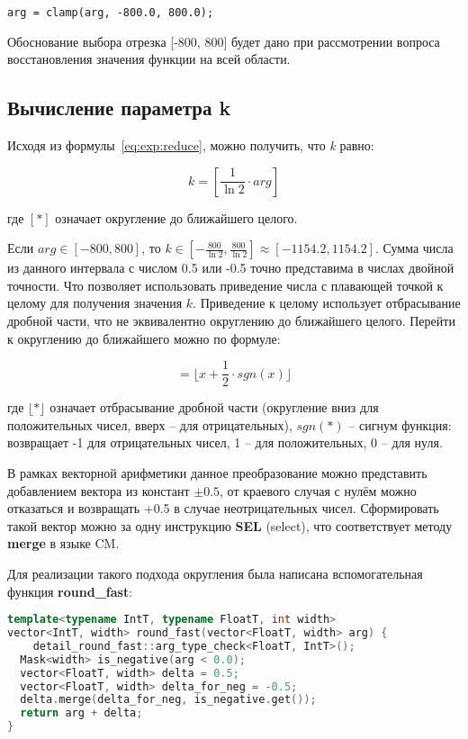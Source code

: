 \begin{lstlisting}
arg = clamp(arg, -800.0, 800.0);
\end{lstlisting}

Обоснование выбора отрезка [-800, 800] будет дано при рассмотрении вопроса восстановления значения функции на всей области.

\subsection{Вычисление параметра k}

Исходя из формулы~\ref{eq:exp:reduce}, можно получить, что \textit{k} равно:

\begin{equation}
    k = [\frac{1}{\ln{2}} \cdot arg]
\end{equation}

где $[*]$ означает округление до ближайшего целого.

Если $arg \in [-800, 800]$, то $k \in [-\frac{800}{\ln{2}}, \frac{800}{\ln{2}}] \approx [-1154.2, 1154.2]$.
Сумма числа из данного интервала с числом 0.5 или -0.5 точно представима в числах двойной точности.
Что позволяет использовать приведение числа с плавающей точкой к целому для получения значения $k$.
Приведение к целому использует отбрасывание дробной части, что не эквивалентно округлению до ближайшего целого.
Перейти к округлению до ближайшего можно по формуле:

\begin{equation}
    [x] = \lfloor x + \frac{1}{2} \cdot sgn(x) \rfloor
\end{equation}

где $\lfloor * \rfloor$ означает отбрасывание дробной части (округление вниз для положительных чисел, вверх -- для отрицательных), $sgn(*)$ -- сигнум функция: возвращает -1 для отрицательных чисел, 1 -- для положительных, 0 -- для нуля.

В рамках векторной арифметики данное преобразование можно представить добавлением вектора из констант $\pm 0.5$, от краевого случая с нулём можно отказаться и возвращать +0.5 в случае неотрицательных чисел.
Сформировать такой вектор можно за одну инструкцию \textbf{SEL} (select), что соответствует методу \textbf{merge} в языке CM.

Для реализации такого подхода округления была написана вспомогательная функция \textbf{round\_fast}:

\begin{lstlisting}[language=C++]
template<typename IntT, typename FloatT, int width>
vector<IntT, width> round_fast(vector<FloatT, width> arg) {
    detail_round_fast::arg_type_check<FloatT, IntT>();
  Mask<width> is_negative(arg < 0.0);
  vector<FloatT, width> delta = 0.5;
  vector<FloatT, width> delta_for_neg = -0.5;
  delta.merge(delta_for_neg, is_negative.get());
  return arg + delta;
}
\end{lstlisting}

